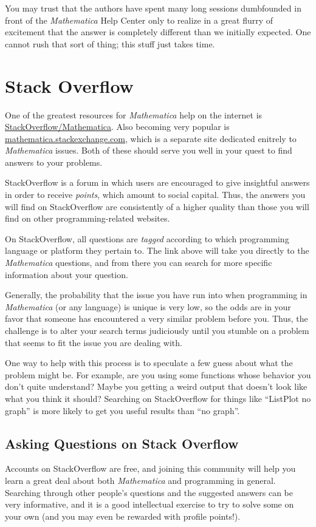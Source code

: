 You may trust that the authors have spent many long sessions dumbfounded in front of the \emph{Mathematica} Help Center only to realize in a great flurry of excitement that the answer is completely different than we initially expected. One cannot rush that sort of thing; this stuff just takes time.

\section{Stack Overflow}
One of the greatest resources for \emph{Mathematica} help on the internet is \href{http://stackoverflow.com/questions/tagged/mathematica}{StackOverflow/Mathematica}. Also becoming very popular is \href{http://mathematica.stackexchange.com/}{mathematica.stackexchange.com}, which is a separate site dedicated enitrely to \emph{Mathematica} issues. Both of these should serve you well in your quest to find answers to your problems.

StackOverflow is a forum in which users are encouraged to give insightful answers in order to receive \emph{points}, which amount to social capital. Thus, the answers you will find on StackOverflow are consistently of a higher quality than those you will find on other programming-related websites.

On StackOverflow, all questions are \emph{tagged} according to which programming language or platform they pertain to. The link above will take you directly to the \emph{Mathematica} questions, and from there you can search for more specific information about your question.

Generally, the probability that the issue you have run into when programming in \emph{Mathematica} (or any language) is unique is very low, so the odds are in your favor that someone has encountered a very similar problem before you. Thus, the challenge is to alter your search terms judiciously until you stumble on a problem that seems to fit the issue you are dealing with.

One way to help with this process is to speculate a few guess about what the problem might be. For example, are you using some functions whose behavior you don't quite understand? Maybe you getting a weird output that doesn't look like what you think it should? Searching on StackOverflow for things like ``ListPlot no graph'' is more likely to get you useful results than ``no graph''. 

\subsection{Asking Questions on Stack Overflow}
Accounts on StackOverflow are free, and joining this community will help you learn a great deal about both \emph{Mathematica} and programming in general. Searching through other people's questions and the suggested answers can be very informative, and it is a good intellectual exercise to try to solve some on your own (and you may even be rewarded with profile points!).

